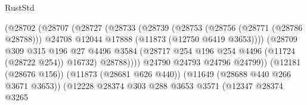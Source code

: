 \begin{lexlean}{RustStd}
\begin{coremodule}
                                              (@28702
                                                (@28707
                                                  (@28727
                                                    (@28733
                                                      (@28739
                                                        (@28753
                                                          (@28756 (@28771 (@28786 @28788)))
                                                          @24708
                                                          @12044
                                                          @17888
                                                          (@11873 (@12750 @6419 @3653))))
                                                      (@28709
                                                        @309
                                                        @315
                                                        @196
                                                        @27
                                                        @4496
                                                        @3584
                                                        (@28717
                                                          @254
                                                          @196
                                                          @254
                                                          @4496
                                                          (@11724 (@28722 @254))
                                                          @16732)
                                                        @28788))))
                                                @24790
                                                @24793
                                                @24796
                                                @24799))
                                            (@12181 (@28676 @156))
                                            (@11873 (@28681 @626 @440))
                                            (@11649 (@28688 @440 @266 @3671 @3653))
                                            (@12228
                                              @28374
                                              @303
                                              @288
                                              @3653
                                              @3571
                                              (@12347
                                                @28374
                                                @3265

\end{coremodule}
\end{lexlean}
